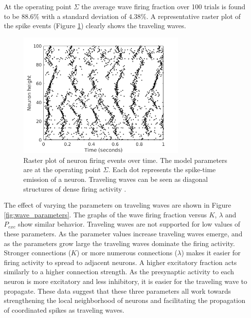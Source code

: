 \documentclass[12pt]{article}
\begin{document}
At the \color{red}operating \color{black} point $\Sigma$ the average wave firing fraction over 100 trials is found to be $88.6\%$ with a standard deviation of $4.38\%$.
A representative raster plot of the spike events (Figure \ref{fig:sigma_raster}) clearly shows the traveling waves.
\begin{figure}[!htb]
 \centering
 \includegraphics[width=0.75\textwidth]{fig/baseline}
 \caption{Raster plot of neuron firing events over time. The model parameters are at the \color{red}operating \color{black} point $\Sigma$. Each dot represents the spike-time emission of a neuron. Traveling waves can be seen as diagonal structures of dense firing activity \parencite{Senk2018}. }
 \label{fig:sigma_raster}
\end{figure}

The effect of varying the parameters on traveling waves are shown in Figure \ref{fig:wave_parameters}.
The graphs of the wave firing fraction versus $K$, $\lambda$ and $P_{exc}$ show similar behavior.
Traveling waves are not supported for low values of these parameters.
As the parameter values increase traveling waves emerge, and as the parameters grow large the traveling waves dominate the firing activity.
Stronger connections ($K$) or more numerous connections ($\lambda$) makes it easier for firing activity to spread to adjacent neurons.
A higher excitatory fraction acts similarly to a higher connection strength. 
As the presynaptic activity to each neuron is more excitatory and less inhibitory, it is easier for the traveling wave to propagate.
These data suggest that these three parameters all work towards strengthening the local neighborhood of neurons and facilitating the propagation of coordinated spikes as traveling waves.
\end{document}
